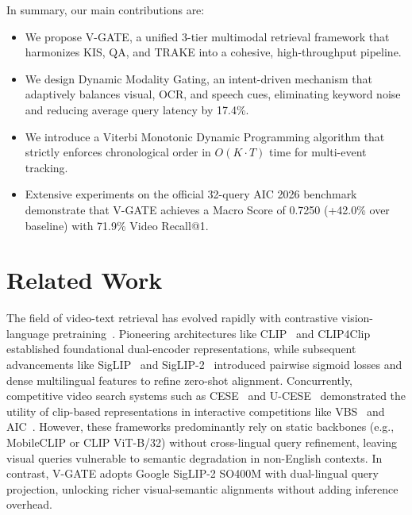 \documentclass[runningheads]{llncs}
\begin{document}
In summary, our main contributions are:
\begin{itemize}
    \item[$\bullet$] We propose V-GATE, a unified 3-tier multimodal retrieval framework that harmonizes KIS, QA, and TRAKE into a cohesive, high-throughput pipeline.
    \item[$\bullet$] We design Dynamic Modality Gating, an intent-driven mechanism that adaptively balances visual, OCR, and speech cues, eliminating keyword noise and reducing average query latency by 17.4\%.
    \item[$\bullet$] We introduce a Viterbi Monotonic Dynamic Programming algorithm that strictly enforces chronological order in $O(K \cdot T)$ time for multi-event tracking.
    \item[$\bullet$] Extensive experiments on the official 32-query AIC 2026 benchmark demonstrate that V-GATE achieves a Macro Score of 0.7250 (+42.0\% over baseline) with 71.9\% Video Recall@1.
\end{itemize}

\section{Related Work}

The field of video-text retrieval has evolved rapidly with contrastive vision-language pretraining~\cite{radford2021learning,luo2022clip4clip,xu2021videoclip}. Pioneering architectures like CLIP~\cite{radford2021learning} and CLIP4Clip~\cite{luo2022clip4clip} established foundational dual-encoder representations, while subsequent advancements like SigLIP~\cite{zhai2023sigmoid} and SigLIP-2~\cite{tschannen2025siglip2} introduced pairwise sigmoid losses and dense multilingual features to refine zero-shot alignment. Concurrently, competitive video search systems such as CESE~\cite{le2025cese} and U-CESE~\cite{le2026ucese} demonstrated the utility of clip-based representations in interactive competitions like VBS~\cite{lokoc2021is} and AIC~\cite{do2025toward}. However, these frameworks predominantly rely on static backbones (e.g., MobileCLIP or CLIP ViT-B/32) without cross-lingual query refinement, leaving visual queries vulnerable to semantic degradation in non-English contexts. In contrast, V-GATE adopts Google SigLIP-2 SO400M with dual-lingual query projection, unlocking richer visual-semantic alignments without adding inference overhead.
\end{document}
